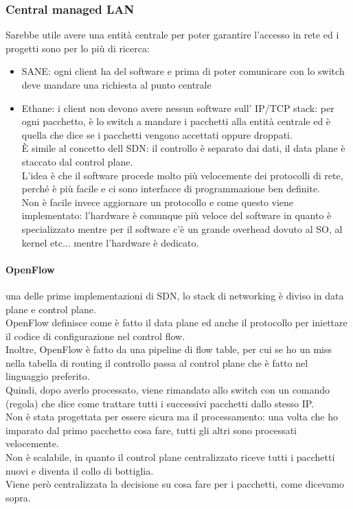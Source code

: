 \documentclass[12pt, oneside]{extbook} %
\begin{document}
\subsubsection{Central managed LAN}
Sarebbe utile avere una entità centrale per poter garantire l'accesso in rete ed i progetti sono per lo più di ricerca:
\begin{itemize}
    \item SANE: ogni client ha del software e prima di poter comunicare con lo switch deve mandare una richiesta al punto centrale
    \item Ethane: i client non devono avere nessun software sull' IP/TCP stack: per ogni pacchetto, è lo switch a mandare i pacchetti alla entità centrale ed è quella che dice se i pacchetti vengono accettati oppure droppati.
    \\È simile al concetto dell SDN: il controllo è separato dai dati, il data plane è staccato dal control plane.
    \\L'idea è che il software procede molto più velocemente dei protocolli di rete, perché è più facile e ci sono interfacce di programmazione ben definite.
    \\Non è facile invece aggiornare un protocollo e come questo viene implementato: l'hardware è comunque più veloce del software in quanto è specializzato mentre per il software c'è un grande overhead dovuto al SO, al kernel etc... mentre l'hardware è dedicato.
\end{itemize}

\paragraph{OpenFlow} una delle prime implementazioni di SDN, lo stack di networking è diviso in data plane e control plane.
\\OpenFlow definisce come è fatto il data plane ed anche il protocollo per iniettare il codice di configurazione nel control flow.
\\Inoltre, OpenFlow è fatto da una pipeline di flow table, per cui se ho un miss nella tabella di routing il controllo passa al control plane che è fatto nel linguaggio preferito.
\\Quindi, dopo averlo processato, viene rimandato allo switch con un comando (regola) che dice come trattare tutti i successivi pacchetti dallo stesso IP.
\\Non è stata progettata per essere sicura ma il processamento: una volta che ho imparato dal primo pacchetto cosa fare, tutti gli altri sono processati velocemente.
\\Non è scalabile, in quanto il control plane centralizzato riceve tutti i pacchetti nuovi e diventa il collo di bottiglia.
\\Viene però centralizzata la decisione su cosa fare per i pacchetti, come dicevamo sopra.
\end{document}
